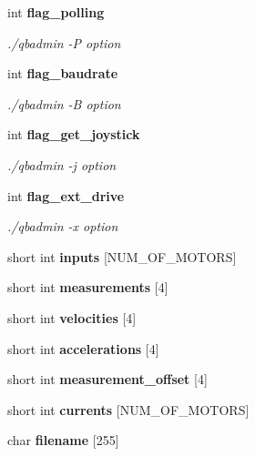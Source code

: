 \begin{DoxyCompactItemize}
\mbox{\label{structglobal__args_ab4fab167b07a819ebd9cdff9d9c232b0}} 
int \textbf{ flag\+\_\+polling}
\begin{DoxyCompactList}\small\item\em ./qbadmin -\/P option \end{DoxyCompactList}\item 
\mbox{\label{structglobal__args_a9781d8e86f2d0d0414d313fec085d20e}} 
int \textbf{ flag\+\_\+baudrate}
\begin{DoxyCompactList}\small\item\em ./qbadmin -\/B option \end{DoxyCompactList}\item 
\mbox{\label{structglobal__args_a58c1425e6d892db3e470cdd99529fce0}} 
int \textbf{ flag\+\_\+get\+\_\+joystick}
\begin{DoxyCompactList}\small\item\em ./qbadmin -\/j option \end{DoxyCompactList}\item 
\mbox{\label{structglobal__args_a5cc1e4efdeddb5e75d5e733f00e5087f}} 
int \textbf{ flag\+\_\+ext\+\_\+drive}
\begin{DoxyCompactList}\small\item\em ./qbadmin -\/x option \end{DoxyCompactList}\item 
\mbox{\label{structglobal__args_a5c5d83977377b63e3671b52680be11aa}} 
short int {\bfseries inputs} [N\+U\+M\+\_\+\+O\+F\+\_\+\+M\+O\+T\+O\+RS]
\item 
\mbox{\label{structglobal__args_a4c65d251aa919a9ae56d11639a748ccf}} 
short int {\bfseries measurements} [4]
\item 
\mbox{\label{structglobal__args_aa064f75f1bb48d252dabea993cd8c393}} 
short int {\bfseries velocities} [4]
\item 
\mbox{\label{structglobal__args_a6fe131122f89735be8fb030f8333e8c8}} 
short int {\bfseries accelerations} [4]
\item 
\mbox{\label{structglobal__args_a8e63e8b1dcf1ee3b6429110e26a7ef3d}} 
short int {\bfseries measurement\+\_\+offset} [4]
\item 
\mbox{\label{structglobal__args_aff0783d0bf2ae80eadc0c85a84db1549}} 
short int {\bfseries currents} [N\+U\+M\+\_\+\+O\+F\+\_\+\+M\+O\+T\+O\+RS]
\item 
\mbox{\label{structglobal__args_a522de19291f23fb0be3eb346cc1957e9}} 
char {\bfseries filename} [255]
\item 
\mbox{\label{structglobal__args_ad0345d4821606480fcb0e28327340660}} 

\end{DoxyCompactItemize}
